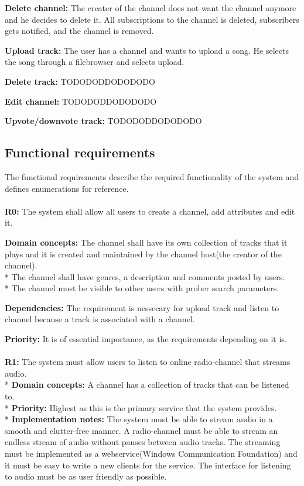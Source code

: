 \documentclass[a4paper,11pt,report]{article}
\begin{document}
\textbf{Delete channel:}
The creater of the channel does not want the channel anymore and he decides to delete it. All subscriptions to the channel is deleted, subscribers gets notified, and the channel is removed.

\textbf{Upload track:}
The user has a channel and wants to upload a song. He selects the song through a filebrowser and selects upload.

\textbf{Delete track:}
TODODODDODODODO

\textbf{Edit channel:}
TODODODDODODODO

\textbf{Upvote/downvote track:}
TODODODDODODODO

\subsection{Functional requirements}
The functional requirements describe the required functionality of the system and defines enumerations for reference.
\\ \\
\textbf{R0:}
The system shall allow all users to create a channel, add attributes and edit it.

\textbf{Domain concepts:}
The channel shall have its own collection of tracks that it plays and it is created and maintained by the channel host(the creator of the channel).\\*
The channel shall have genres, a description and comments posted by users.\\*
The channel must be visible to other users with prober search parameters.

\textbf{Dependencies:}
The requirement is nessecary for upload track and listen to channel because a track is associated with a channel.

\textbf{Priority:}
It is of essential importance, as the requirements depending on it is.
\\ \\

\textbf{R1:}
The system must allow users to listen to online radio-channel that streams audio. \\*
\textbf{Domain concepts:}
A channel has a collection of tracks that can be listened to. \\*
\textbf{Priority:}
Highest as this is the primary service that the system provides. \\*
\textbf{Implementation notes:}
The system must be able to stream audio in a smooth and clutter-free manner.
A radio-channel must be able to stream an endless stream of audio without pauses between audio tracks.
The streaming must be implemented as a webservice(Windows Communication Foundation) and it must be
easy to write a new clients for the service.
The interface for listening to audio must be as user friendly as possible.
\\ \\
\end{document}

